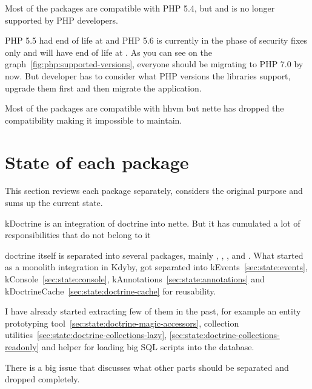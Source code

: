 Most of the packages are compatible with PHP 5.4, but  and is no longer supported by PHP developers.

PHP 5.5 had end of life at  and PHP 5.6 is currently in the phase of security fixes only and will have end of life at . As you can see on the graph~\ref{fig:php:supported-versions}, everyone should be migrating to PHP 7.0 by now. But developer has to consider what PHP versions the libraries support, upgrade them first and then migrate the application.

Most of the packages are compatible with \gls{hhvm} but \gls{nette} has dropped the compatibility making it impossible to maintain.

\section{State of each package}

This section reviews each package separately, considers the original purpose and sums up the current state.

 \label{sec:state:doctrine}

\gls{kDoctrine} is an integration of \gls{doctrine} into \gls{nette}. But it has cumulated a lot of responsibilities that do not belong to it

\gls{doctrine} itself is separated into several packages, mainly , , ,  and . What started as a monolith integration in Kdyby, got separated into \gls{kEvents}~\ref{sec:state:events}, \gls{kConsole}~\ref{sec:state:console}, \gls{kAnnotations}~\ref{sec:state:annotations} and \gls{kDoctrineCache}~\ref{sec:state:doctrine-cache} for reusability.

I have already started extracting few of them in the past, for example an entity prototyping tool~\ref{sec:state:doctrine-magic-accessors}, collection utilities~\ref{sec:state:doctrine-collections-lazy}, \ref{sec:state:doctrine-collections-readonly} and helper for loading big SQL scripts into the database.

There is a big issue  that discusses what other parts should be separated and dropped completely.

